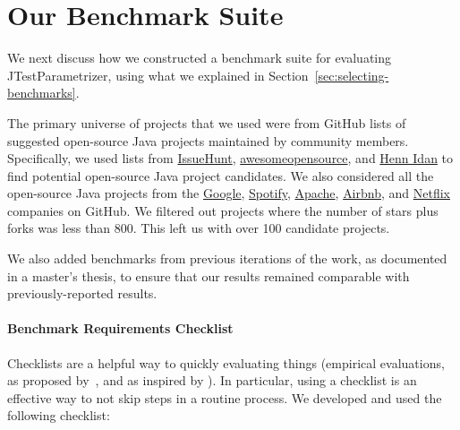 \section{Our Benchmark Suite}
\label{sec:our-benchmarks}
We next discuss how we constructed a benchmark suite for evaluating JTestParametrizer, using what we explained in Section~\ref{sec:selecting-benchmarks}.

The primary universe of projects that we used were from GitHub lists of suggested open-source Java projects maintained by community members. Specifically, we used lists from \href{https://medium.com/issuehunt/50-top-java-projects-on-github-adbfe9f67dbc}{IssueHunt}, \href{https://awesomeopensource.com/projects/maven-plugin}{awesomeopensource}, and \href{https://www.overops.com/blog/the-hitchhikers-guide-to-github-13-java-projects-you-should-try/}{Henn Idan} to find potential open-source Java project candidates. 
We also considered all the open-source Java projects from the \href{https://github.com/google/?q=&type=&language=java&sort=stargazers}{Google}, \href{https://github.com/spotify/?q=&type=&language=java&sort=stargazers}{Spotify}, \href{https://github.com/apache/?q=&type=&language=java&sort=stargazers}{Apache}, \href{https://github.com/airbnb/?q=&type=&language=java&sort=stargazers}{Airbnb}, and \href{https://github.com/Netflix?q=&type=&language=java&sort=stargazers}{Netflix} companies on GitHub. We filtered out projects where the number of stars plus forks was less than 800. This left us with over 100 candidate projects.

We also added benchmarks from previous iterations of the work, as documented in a master's thesis, to ensure that our results remained comparable with previously-reported results.

\paragraph{Benchmark Requirements Checklist}
Checklists are a helpful way to quickly evaluating things (empirical evaluations, as proposed by~, and as inspired by \cite{gawande09:_check_manif}). In particular, using a checklist is an effective way to not skip steps in a routine process. We developed and used the following checklist:

